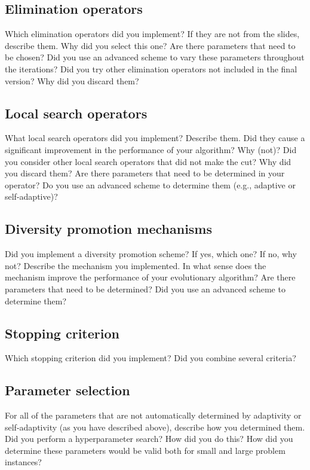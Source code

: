 \documentclass[a4paper,10pt]{article}
\newcommand{\ReplaceMe}[1]{{\color{blue}#1}}
\begin{document}
\subsection{Elimination operators}

\ReplaceMe{Which elimination operators did you implement? If they are not from the slides, describe them. Why did you select this one? Are there parameters that need to be chosen? Did you use an advanced scheme to vary these parameters throughout the iterations? Did you try other elimination operators not included in the final version? Why did you discard them?} 

\subsection{Local search operators}

\ReplaceMe{What local search operators did you implement? Describe them. Did they cause a significant improvement in the performance of your algorithm? Why (not)? Did you consider other local search operators that did not make the cut? Why did you discard them? Are there parameters that need to be determined in your operator? Do you use an advanced scheme to determine them (e.g., adaptive or self-adaptive)?}

\subsection{Diversity promotion mechanisms}

\ReplaceMe{Did you implement a diversity promotion scheme? If yes, which one? If no, why not? Describe the mechanism you implemented. In what sense does the mechanism improve the performance of your evolutionary algorithm? Are there parameters that need to be determined? Did you use an advanced scheme to determine them?}

\subsection{Stopping criterion}

\ReplaceMe{Which stopping criterion did you implement? Did you combine several criteria?}

\subsection{Parameter selection}

\ReplaceMe{For all of the parameters that are not automatically determined by adaptivity or self-adaptivity (as you have described above), describe how you determined them. Did you perform a hyperparameter search? How did you do this? How did you determine these parameters would be valid both for small and large problem instances?}
\end{document}
